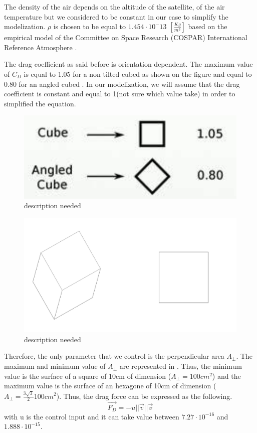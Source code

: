 The density of the air depends on the altitude of the satellite, of the air temperature but we considered to be constant in our case to simplify the modelization. $\rho$ is chosen to be equal to $1.454 \cdot 10^-13$ $[\frac{Kg}{m^3}]$ based on the  empirical model of the Committee on Space Research (COSPAR) International Reference Atmosphere \cite{SADC}.

The drag coefficient as said before is orientation dependent. The maximum value of $C_D$ is equal to 1.05 for a non tilted cubed as shown on the figure  and equal to 0.80 for an angled cubed \cite{wik}. In our modelization, we will assume that the drag coefficient is constant and equal to 1(not sure which value take) in order to simplified the equation. 
\begin{table}[H]
	\begin{minipage}[b]{0.49\linewidth}
		\centering
		\begin{figure}[H]
			\centering
			\includegraphics[width=0.8\linewidth]{figures/drag_coef}
			\caption{description needed}
			\label{fig:drag}
		\end{figure}
	\end{minipage}\hfill
	\begin{minipage}[b]{0.49\linewidth}
		\centering
		\begin{figure}[H]
			\centering
			\includegraphics[width=1\linewidth]{figures/a_prep}
			\caption{description needed}
			\label{fig:cub}
		\end{figure}
	\end{minipage}
\end{table}
Therefore, the only parameter that we control is the perpendicular area $A_{\perp}$. The maximum and minimum value of $A_{\perp}$ are represented in . Thus, the minimum value is the surface of a square of 10cm of dimension ($A_{\perp} = 100cm^2$) and the maximum value is the surface of an hexagone of 10cm of dimension ($A_{\perp} = \frac{3\sqrt{3}}{2} 100cm^2$).
Thus, the drag force can be expressed as the following. 
\[
\vec{F_D} = -u ||\vec{v}|| \vec{v}
\]
with u is the control input and it can take value between $7.27 \cdot 10^{-16}$ and $1.888 \cdot 10^{-15}$.
